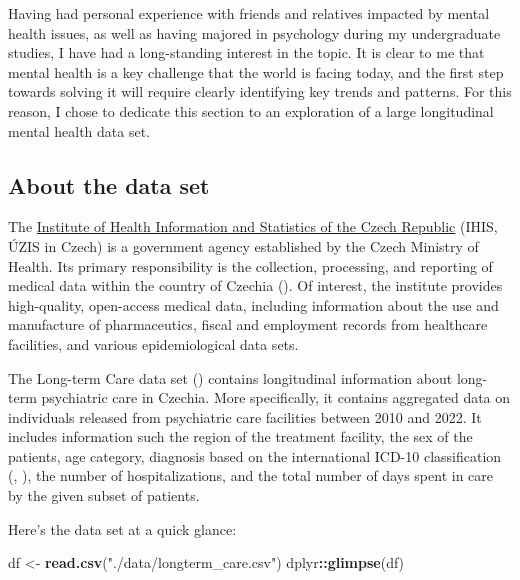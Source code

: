 \documentclass[
]{book}
\newenvironment{Shaded}{\begin{snugshade}}{\end{snugshade}}
\newcommand{\FunctionTok}[1]{\textcolor[rgb]{0.13,0.29,0.53}{\textbf{#1}}}
\newcommand{\NormalTok}[1]{#1}
\newcommand{\OtherTok}[1]{\textcolor[rgb]{0.56,0.35,0.01}{#1}}
\newcommand{\SpecialCharTok}[1]{\textcolor[rgb]{0.81,0.36,0.00}{\textbf{#1}}}
\newcommand{\StringTok}[1]{\textcolor[rgb]{0.31,0.60,0.02}{#1}}
\theoremstyle{definition}
\theoremstyle{definition}
\theoremstyle{definition}
\theoremstyle{definition}
\theoremstyle{remark}
\begin{document}
Having had personal experience with friends and relatives impacted by mental health issues, as well as having majored in psychology during my undergraduate studies, I have had a long-standing interest in the topic. It is clear to me that mental health is a key challenge that the world is facing today, and the first step towards solving it will require clearly identifying key trends and patterns. For this reason, I chose to dedicate this section to an exploration of a large longitudinal mental health data set.

\subsection{About the data set}\label{about-the-data-set}

The \href{https://www.uzis.cz/index-en.php}{Institute of Health Information and Statistics of the Czech Republic} (IHIS, ÚZIS in Czech) is a government agency established by the Czech Ministry of Health. Its primary responsibility is the collection, processing, and reporting of medical data within the country of Czechia (). Of interest, the institute provides high-quality, open-access medical data, including information about the use and manufacture of pharmaceutics, fiscal and employment records from healthcare facilities, and various epidemiological data sets.

The Long-term Care data set () contains longitudinal information about long-term psychiatric care in Czechia. More specifically, it contains aggregated data on individuals released from psychiatric care facilities between 2010 and 2022. It includes information such the region of the treatment facility, the sex of the patients, age category, diagnosis based on the international ICD-10 classification (, ), the number of hospitalizations, and the total number of days spent in care by the given subset of patients.

Here's the data set at a quick glance:

\begin{Shaded}
\begin{Highlighting}[]
\NormalTok{df }\OtherTok{\textless{}{-}} \FunctionTok{read.csv}\NormalTok{(}\StringTok{"./data/longterm\_care.csv"}\NormalTok{)}
\NormalTok{dplyr}\SpecialCharTok{::}\FunctionTok{glimpse}\NormalTok{(df)}
\end{Highlighting}
\end{Shaded}
\end{document}
